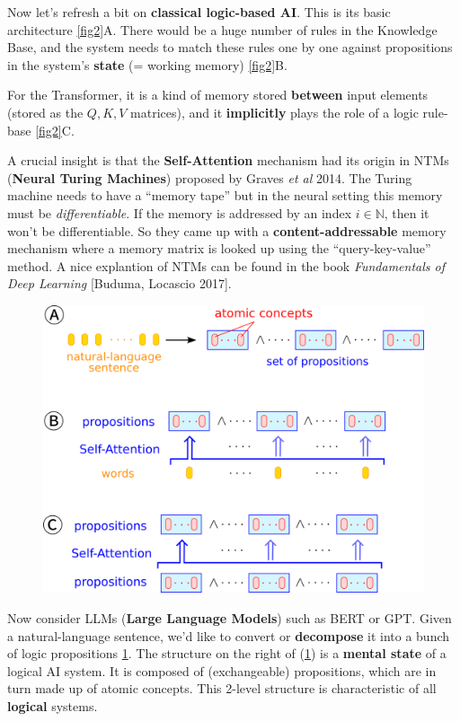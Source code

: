 \documentclass[runningheads]{llncs}
\newcommand{\circled}[1]{{\textcircled{\sffamily \scriptsize{#1}}}}
\begin{document}
Now let's refresh a bit on \textbf{classical logic-based AI}.  This is its basic architecture \ref{fig2}\circled{A}.  There would be a huge number of rules in the Knowledge Base, and the system needs to match these rules one by one against propositions in the system's \textbf{state} (= working memory) \ref{fig2}\circled{B}.

For the Transformer, it is a kind of memory stored \textbf{between} input elements (stored as the $Q, K, V$ matrices), and it \textbf{implicitly} plays the role of a logic rule-base \ref{fig2}\circled{C}.

A crucial insight is that the \textbf{Self-Attention} mechanism had its origin in NTMs (\textbf{Neural Turing Machines}) proposed by Graves \textit{et al} 2014.  The Turing machine needs to have a ``memory tape'' but in the neural setting this memory must be \textit{differentiable}.  If the memory is addressed by an index $i \in \mathbb{N}$, then it won't be differentiable.  So they came up with a \textbf{content-addressable} memory mechanism where a memory matrix is looked up using the ``query-key-value'' method.  A nice explantion of NTMs can be found in the book \textit{Fundamentals of Deep Learning} [Buduma, Locascio 2017].

\begin{figure}[h]
	\centering
	\includegraphics[scale=0.6]{fig3.png}
	\caption{}
	\label{fig3}
\end{figure}

Now consider LLMs (\textbf{Large Language Models}) such as BERT or GPT.  Given a natural-language sentence, we'd like to convert or \textbf{decompose} it into a bunch of logic propositions \ref{fig3}.  The structure on the right of (\ref{fig3}) is a \textbf{mental state} of a logical AI system.  It is composed of (exchangeable) propositions, which are in turn made up of atomic concepts.  This 2-level structure is characteristic of all \textbf{logical} systems.
\end{document}
